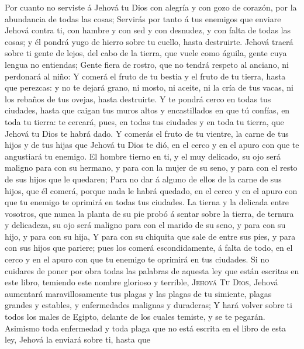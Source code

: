  Por cuanto no serviste á Jehová tu Dios con alegría y
con gozo de corazón, por la abundancia de todas las cosas;
 Servirás por tanto á tus enemigos que enviare Jehová
contra ti, con hambre y con sed y con desnudez, y con falta de todas las
cosas; y él pondrá yugo de hierro sobre tu cuello, hasta destruirte.
 Jehová traerá sobre ti gente de lejos, del cabo de la
tierra, que vuele como águila, gente cuya lengua no entiendas;
 Gente fiera de rostro, que no tendrá respeto al anciano,
ni perdonará al niño:  Y comerá el fruto de tu bestia y
el fruto de tu tierra, hasta que perezcas: y no te dejará grano, ni
mosto, ni aceite, ni la cría de tus vacas, ni los rebaños de tus ovejas,
hasta destruirte.  Y te pondrá cerco en todas tus
ciudades, hasta que caigan tus muros altos y encastillados en que tú
confías, en toda tu tierra: te cercará, pues, en todas tus ciudades y en
toda tu tierra, que Jehová tu Dios te habrá dado.  Y
comerás el fruto de tu vientre, la carne de tus hijos y de tus hijas que
Jehová tu Dios te dió, en el cerco y en el apuro con que te angustiará
tu enemigo.  El hombre tierno en ti, y el muy delicado,
su ojo será maligno para con su hermano, y para con la mujer de su seno,
y para con el resto de sus hijos que le quedaren;  Para
no dar á alguno de ellos de la carne de sus hijos, que él comerá, porque
nada le habrá quedado, en el cerco y en el apuro con que tu enemigo te
oprimirá en todas tus ciudades.  La tierna y la delicada
entre vosotros, que nunca la planta de su pie probó á sentar sobre la
tierra, de ternura y delicadeza, su ojo será maligno para con el marido
de su seno, y para con su hijo, y para con su hija,  Y
para con su chiquita que sale de entre sus pies, y para con sus hijos
que pariere; pues los comerá escondidamente, á falta de todo, en el
cerco y en el apuro con que tu enemigo te oprimirá en tus ciudades.
 Si no cuidares de poner por obra todas las palabras de
aquesta ley que están escritas en este libro, temiendo este nombre
glorioso y terrible, \textsc{Jehová} \textsc{Tu} \textsc{Dios},
 Jehová aumentará maravillosamente tus plagas y las
plagas de tu simiente, plagas grandes y estables, y enfermedades
malignas y duraderas;  Y hará volver sobre ti todos los
males de Egipto, delante de los cuales temiste, y se te pegarán.
 Asimismo toda enfermedad y toda plaga que no está
escrita en el libro de esta ley, Jehová la enviará sobre ti, hasta que
